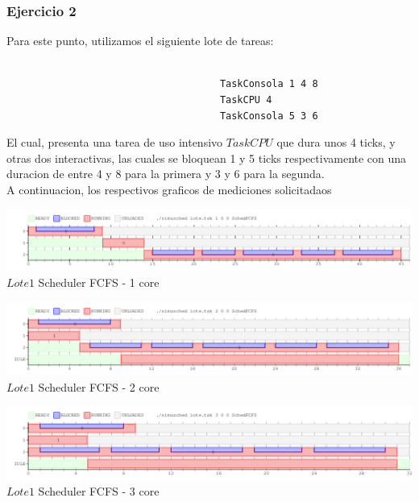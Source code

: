 \subsubsection[Resolución Ejercicio 2]{Ejercicio 2}

\indent Para este punto, utilizamos el siguiente lote de tareas:
\begin{verbatim}
 
                                     TaskConsola 1 4 8
                                     TaskCPU 4
                                     TaskConsola 5 3 6

\end{verbatim}

\indent El cual, presenta una tarea de uso intensivo $TaskCPU$ que dura unos 4 ticks, y otras dos interactivas, las cuales se
bloquean 1 y 5 ticks respectivamente con una duracion de entre 4 y 8 para la primera y 3 y 6 para la segunda.\\
A continuacion, los respectivos graficos de mediciones solicitadaos


\vspace*{0.3cm} \vspace*{0.3cm}
  \begin{center}
 \includegraphics[scale=0.5]{ejercicio2-1nucleo.png}
 { $Lote 1$ Scheduler FCFS - 1 core }
 \end{center}
  \vspace*{0.3cm}


\vspace*{0.3cm} \vspace*{0.3cm}
  \begin{center}
 \includegraphics[scale=0.5]{ejercicio2-2nucleo.png}
 { $Lote 1$ Scheduler FCFS - 2 core }
 \end{center}
  \vspace*{0.3cm}

\vspace*{0.3cm} \vspace*{0.3cm}
  \begin{center}
 \includegraphics[scale=0.5]{ejercicio2-3nucleo.png}
  {$Lote 1$ Scheduler FCFS - 3 core }
 \end{center}
  \vspace*{0.3cm}

